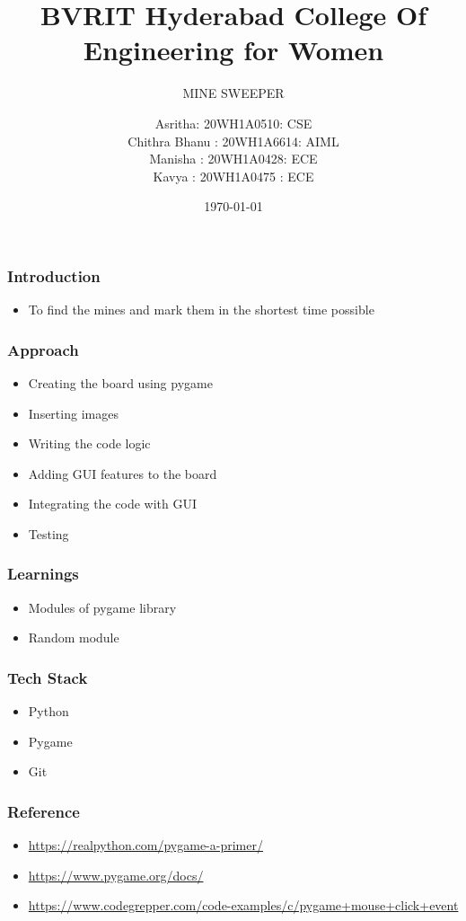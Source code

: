 \documentclass[14pt]{beamer}
\title{BVRIT Hyderabad College Of Engineering for Women}
\subtitle{MINE SWEEPER}
\date{\today}
\author[Bvrith]{Asritha: 20WH1A0510: CSE \\ Chithra Bhanu : 20WH1A6614: AIML  \\ Manisha : 20WH1A0428: ECE  \\ Kavya : 20WH1A0475 : ECE}
\begin{document}
    \begin{frame}
        \titlepage
    \end{frame}
    \begin{frame}
	\frametitle{Introduction}
        \begin{itemize}
	    \item To find the mines and mark them in the shortest time possible
	\end{itemize}
    \end{frame}
    \begin{frame}
	\frametitle{Approach}
	\begin{itemize}
	    \item Creating the board using pygame\\
        \item Inserting images\\
        \item Writing the code logic 
	    \item Adding GUI features to the board \\
	    \item Integrating the code with GUI
	    \item Testing

	\end{itemize}
    \end{frame}
    \begin{frame}
        \frametitle{Learnings}
	\begin{itemize}
	    \item Modules of pygame library
	    \item Random module 
	\end{itemize}
    \end{frame}
    \begin{frame}
        \frametitle{Tech Stack}
	\begin{itemize}
	    \item Python 
	    \item Pygame
	    \item Git
	\end{itemize}
    \end{frame}
 \begin{frame}
        \frametitle{Reference}
	\begin{itemize}
	    \item  \url{https://realpython.com/pygame-a-primer/}
	     \item \url{https://www.pygame.org/docs/}
	      \item \url{https://www.codegrepper.com/code-examples/c/pygame+mouse+click+event}
	\end{itemize}
    \end{frame}
\end{document}
